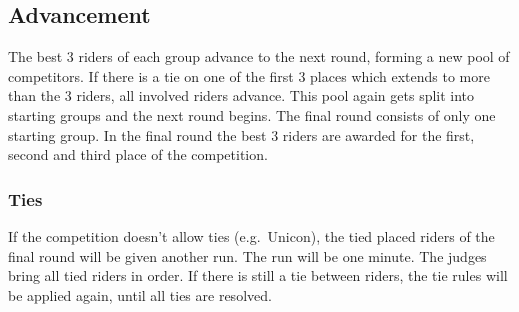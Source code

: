 \subsection{Advancement}
The best 3 riders of each group advance to the next round, forming a new pool of competitors.
If there is a tie on one of the first 3 places which extends to more than the 3 riders, all involved riders advance.
This pool again gets split into starting groups and the next round begins.
The final round consists of only one starting group.
In the final round the best 3 riders are awarded for the first, second and third place of the competition.

\subsubsection{Ties}
If the competition doesn't allow ties (e.g.\ Unicon), the tied placed riders of the final round will be given another run.
The run will be one minute.
The judges bring all tied riders in order.
If there is still a tie between riders, the tie rules will be applied again, until all ties are resolved.
